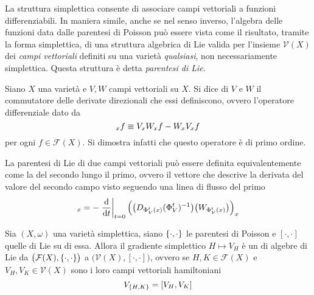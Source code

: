 La struttura simplettica consente di associare campi vettoriali a funzioni differenziabili. In maniera simile, anche se nel senso inverso, l'algebra delle funzioni data dalle parentesi di Poisson può essere vista come il risultato, tramite la forma simplettica, di una struttura algebrica di Lie valida per l'insieme $\mathcal{V}(X)$ dei \emph{campi vettoriali} definiti su una varietà \emph{qualsiasi}, non necessariamente simplettica. Questa struttura è detta \emph{parentesi di Lie}.
\begin{definition}
  Siano $X$ una varietà e $V,W$ campi vettoriali su $X$. Si dice  di $V$ e $W$ il commutatore delle derivate direzionali che essi definiscono, ovvero l'operatore differenziale dato da
  \begin{equation*}
  [V,W]_x f\defeq V_x W_x f - W_x V_x f
  \end{equation*}
  per ogni $f \in \mathcal{F}(X)$. Si dimostra infatti che questo operatore è di primo ordine.
\end{definition}
\begin{remark}
  La parentesi di Lie di due campi vettoriali può essere definita equivalentemente come la  del secondo lungo il primo, ovvero il vettore che descrive la derivata del valore del secondo campo visto seguendo una linea di flusso del primo
  \begin{equation*}
    [V,W]_x = - \eval{\dv{t}}_{t=0} \Big(\big(D_{\Phi_V^t(x)} (\Phi_V^t)^{-1}\big)\big(W_{\Phi_V^t(x)}\big) \Big)_x
    \end{equation*}
\end{remark}
\begin{theorem}
  Sia $(X, \omega)$ una varietà simplettica, siano $\pb{\cdot}{\cdot}$ le parentesi di Poisson e $[\cdot , \cdot ]$ quelle di Lie su di essa. Allora il gradiente simplettico $H \mapsto V_H$ è un  di algebre di Lie da $\big(\mathcal{F}(X), \pb{\cdot}{\cdot} \big)$ a $\big(\mathcal{V}(X), [\cdot , \cdot]\big)$, ovvero se $H,K \in \mathcal{F}(X)$ e $V_H, V_K \in \mathcal{V}(X)$ sono i loro campi vettoriali hamiltoniani \begin{equation*}
  V_{\pb{H}{K}} = [V_H, V_K]
  \end{equation*} 
\end{theorem}

